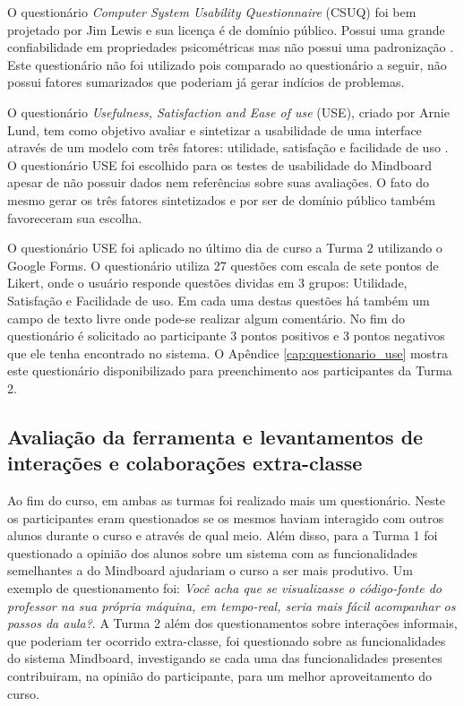 O questionário \emph{Computer System Usability Questionnaire} (CSUQ) foi bem projetado por Jim Lewis e sua licença é de domínio público. Possui uma grande confiabilidade em propriedades psicométricas mas não possui uma padronização \cite{csuq}. Este questionário não foi utilizado pois comparado ao questionário a seguir, não possui fatores sumarizados que poderiam já gerar indícios de problemas.

O questionário \emph{Usefulness, Satisfaction and Ease of use} (USE), criado por Arnie Lund, tem como objetivo avaliar e sintetizar a usabilidade de uma interface através de um modelo com três fatores: utilidade, satisfação e facilidade de uso \cite{useq}. O questionário USE foi escolhido para os testes de usabilidade do Mindboard apesar de não possuir dados nem referências sobre suas avaliações. O fato do mesmo gerar os três fatores sintetizados e por ser de domínio público também favoreceram sua escolha.

O questionário USE foi aplicado no último dia de curso a Turma 2 utilizando o Google Forms. O questionário utiliza 27 questões com escala de sete pontos de Likert, onde o usuário responde questões dividas em 3 grupos: Utilidade, Satisfação e Facilidade de uso. Em cada uma destas questões há também um campo de texto livre onde pode-se realizar algum comentário. No fim do questionário é solicitado ao participante 3 pontos positivos e 3 pontos negativos que ele tenha encontrado no sistema. O Apêndice \ref{cap:questionario_use} mostra este questionário disponibilizado para preenchimento aos participantes da Turma 2.

\subsection{Avaliação da ferramenta e levantamentos de interações e colaborações extra-classe}

Ao fim do curso, em ambas as turmas foi realizado mais um questionário. Neste os participantes eram questionados se os mesmos haviam interagido com outros alunos durante o curso e através de qual meio. Além disso, para a Turma 1 foi questionado a opinião dos alunos sobre um sistema com as funcionalidades semelhantes a do Mindboard ajudariam o curso a ser mais produtivo. Um exemplo de questionamento foi: \emph{Você acha que se visualizasse o código-fonte do professor na sua própria máquina, em tempo-real, seria mais fácil acompanhar os passos da aula?}. A Turma 2 além dos questionamentos sobre interações informais, que poderiam ter ocorrido extra-classe, foi questionado sobre as funcionalidades do sistema Mindboard, investigando se cada uma das funcionalidades presentes contribuiram, na opinião do participante, para um melhor aproveitamento do curso.

